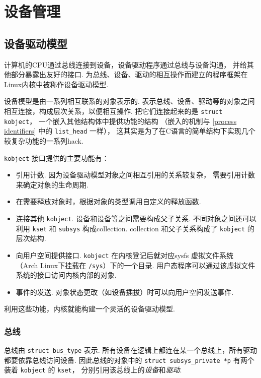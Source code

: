 \section{设备管理}
\subsection{设备驱动模型}
计算机的CPU通过总线连接到设备，设备驱动程序通过总线与设备沟通，
并给其他部分暴露出友好的接口.
为总线、设备、驱动的相互操作而建立的程序框架在Linux内核中被称作设备驱动模型.
\cite{devicemodel}\cite{bovet2005understanding}

设备模型是由一系列相互联系的对象表示的.
表示总线、设备、驱动等的对象之间相互连接，构成层次关系，以便相互操作.
把它们连接起来的是 \lstinline{struct kobject}，
一个嵌入其他结构体中提供功能的结构
（嵌入的机制与 \ref{process identifiers} 中的 \lstinline{list_head} 一样），
这其实是为了在C语言的简单结构下实现几个较复杂功能的一系列hack.

\lstinline{kobject} 接口提供的主要功能有\cite{kobject}：
\begin{itemize}
	\item 引用计数. 因为设备驱动模型对象之间相互引用的关系较复杂，
	      需要引用计数来确定对象的生命周期.
	\item 在需要释放对象时，根据对象的类型调用自定义的释放函数.
	\item 连接其他 \lstinline{kobject}.
	      设备和设备等之间需要构成父子关系.
	      不同对象之间还可以利用 \lstinline{kset} 和 \lstinline{subsys} 构成collection.
	      collection 和父子关系构成了 \lstinline{kobject} 的层次结构.
	\item 向用户空间提供接口.
	      \lstinline{kobject} 在内核登记后就对应sysfs 虚拟文件系统
	      （Arch Linux下挂载在 \lstinline{/sys}）下的一个目录.
	      用户态程序可以通过该虚拟文件系统的接口访问内核内部的对象.
	\item 事件的发送. 对象状态更改（如设备插拔）时可以向用户空间发送事件.
\end{itemize}
利用这些功能，内核就能构建一个灵活的设备驱动模型.

\subsubsection{总线}
总线由 \lstinline{struct bus_type} 表示.
所有设备在逻辑上都连在某一个总线上，所有驱动都要依靠总线访问设备.
因此总线的对象中的 \lstinline{struct subsys_private *p}
有两个装着 \lstinline{kobject} 的 \lstinline{kset}，
分别引用该总线上的\emph{设备}和\emph{驱动}.

